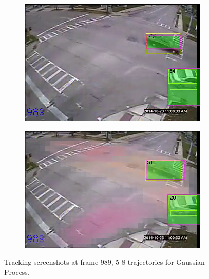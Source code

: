 \begin{figure}
\centering
    \begin{subfigure}{0.43\linewidth}
        \includegraphics[width=\linewidth]{./img/gp/193402-kf-3.png}
        \label{subfig:kf-3}
    \end{subfigure}
    \begin{subfigure}{0.43\linewidth}
        \includegraphics[width=\linewidth]{./img/gp/193402-gp-3.png}
        \label{subfig:gp-3}
    \end{subfigure}%
    \caption{Tracking screenshots at frame 989, 5-8 trajectories for Gaussian Process.}
    \label{fig:kf-gp-3}
\end{figure}